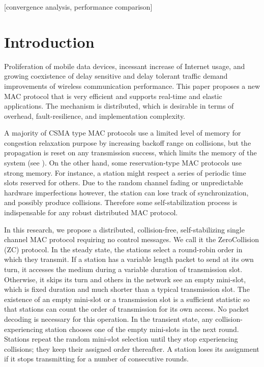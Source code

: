 \documentclass{acm_proc_article-sp}
\begin{document}
 [convergence analysis, performance comparison]





\section{Introduction}
Proliferation of mobile data devices, incessant increase of Internet usage, and growing coexistence of delay sensitive and delay tolerant traffic demand improvements of wireless communication performance. This paper proposes a new MAC protocol that is very efficient and supports real-time and elastic applications.  The mechanism is distributed, which is desirable in terms of overhead, fault-resilience, and implementation complexity.

A majority of CSMA \cite{1975KLEINROCK1} type MAC protocols use a limited level of memory for congestion relaxation purpose by increasing backoff range on collisions, but the propagation is reset on any transmission success, which limits the memory of the system (see \cite{1997IEEE80211}).
On the other hand, some reservation-type MAC protocols use strong memory. For instance, a station might respect a series of periodic time slots reserved for others.
Due to the random channel fading or unpredictable hardware imperfections however, the station can lose track of synchronization, and possibly produce collisions. Therefore some self-stabilization process is indispensable for any robust distributed MAC protocol.

In this research, we propose a distributed, collision-free, self-stabilizing single channel MAC protocol requiring no control messages. We call it the ZeroCollision (ZC) protocol.
In the steady state, the stations select a round-robin order in which they transmit.  If a station has a variable length packet to send at its own turn, it accesses the medium during a variable duration of transmission slot. Otherwise, it skips its turn and others in the network see an empty mini-slot, which is fixed duration and much shorter than a typical transmission slot. The existence of an empty mini-slot or a transmission slot is a sufficient statistic so that stations can count the order of transmission for its own access. No packet decoding is necessary for this operation.
In the transient state, any collision-experiencing station chooses one of the empty mini-slots in the next round. Stations repeat the random mini-slot selection until they stop experiencing collisions; they keep their assigned order thereafter.  A station loses its assignment if it stops transmitting for a number of consecutive rounds.
\end{document}
